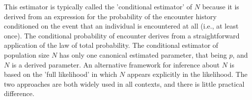 \documentclass{book}
\begin{document}

This estimator is typically called the 'conditional estimator' of $N$
because it is derived from an expression for the probability of the
encounter history conditioned on the event that an individual is
encountered at all (i.e., at least once).
The conditional probability of encounter
 derives from a straightforward application of the law of total
probability.  The conditional estimator of population size $N$ has
only one canonical estimated parameter, that being $p$, and $N$ is a
derived parameter. An alternative framework for inference about $N$ is
based on the 
'full likelihood' in which $N$ appears explicitly in the likelihood.
The two approaches are both widely used in all contexts, and there is
little practical difference. 

\end{document}
